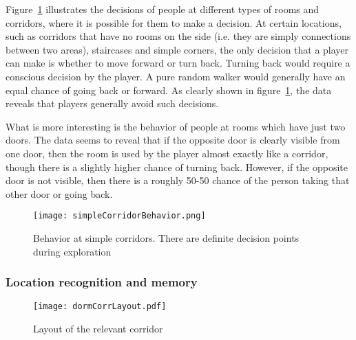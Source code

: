 Figure~\ref{fig:simpleCorridorBehavior} illustrates the decisions of people at different types of rooms and corridors, where it is possible for them to make a decision. At certain locations, such as corridors that have no rooms on the side (i.e. they are simply connections between two areas), staircases and simple corners, the only decision that a player can make is whether to move forward or turn back. Turning back would require a conscious decision by the player. A pure random walker would generally have an equal chance of going back or forward. As clearly shown in figure~\ref{fig:simpleCorridorBehavior}, the data reveals that players generally avoid such decisions.

What is more interesting is the behavior of people at rooms which have just two doors. The data seems to reveal that if the opposite door is clearly visible from one door, then the room is used by the player almost exactly like a corridor, though there is a slightly higher chance of turning back. However, if the opposite door is not visible, then there is a roughly 50-50 chance of the person taking that other door or going back.

\begin{figure}[tb]
    \begin{center}
        \texttt{[image: simpleCorridorBehavior.png]}
    \end{center}
    \caption{Behavior at simple corridors. There are definite decision points during exploration}
    \label{fig:simpleCorridorBehavior}
\end{figure}

\subsubsection{Location recognition and memory} %
\label{sec:on_memory_and_exploration}

\begin{figure}[tb]
    \begin{center}
        \texttt{[image: dormCorrLayout.pdf]}
    \end{center}
    \caption{Layout of the relevant corridor}
    \label{fig:dormCorrLayout}
\end{figure}

